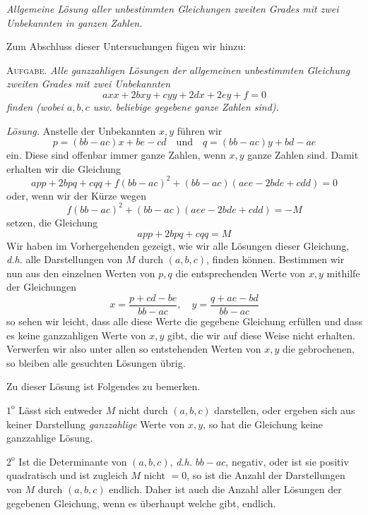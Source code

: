 \begin{center}
\textit{Allgemeine Lösung aller unbestimmten Gleichungen zweiten Grades mit zwei Unbekannten in ganzen Zahlen.}
\end{center}

Zum Abschluss dieser Untersuchungen fügen wir hinzu:

\textsc{Aufgabe.} \textit{Alle ganzzahligen Lösungen der allgemeinen} \textit{unbestimmten Gleichung zweiten Grades mit zwei Unbekannten}
\[
axx+2bxy+cyy+2dx+2ey+f=0
\]
\textit{finden (wobei $a,b,c$ usw. beliebige gegebene ganze Zahlen sind).}

\textit{Lösung.} Anstelle der Unbekannten $x,y$ führen wir
\[
p=(bb-ac)x+be-cd\quad\text{und}\quad q=(bb-ac)y+bd-ae
\]
ein. Diese sind offenbar immer ganze Zahlen, wenn $x,y$ ganze Zahlen sind. Damit erhalten wir die Gleichung
\[
app+2bpq+cqq+f(bb-ac)^2+(bb-ac)(aee-2bde+cdd)=0
\]
oder, wenn wir der Kürze wegen
\[
f(bb-ac)^2+(bb-ac)(aee-2bde+cdd)=-M
\]
setzen, die Gleichung
\[
app+2bpq+cqq=M
\]
Wir haben im Vorhergehenden gezeigt, wie wir alle Lösungen dieser Gleichung, \textit{d.h.} alle Darstellungen von $M$ durch $(a,b,c)$, finden können. Bestimmen wir nun aus den einzelnen Werten von $p,q$ die entsprechenden Werte von $x,y$ mithilfe der Gleichungen
\[
x=\frac{p+cd-be}{bb-ac},\quad y=\frac{q+ae-bd}{bb-ac}
\]
so sehen wir leicht, dass alle diese Werte die gegebene Gleichung erfüllen und dass es keine ganzzahligen Werte von $x,y$ gibt, die wir auf diese Weise nicht erhalten. Verwerfen wir also unter allen so entstehenden Werten von $x,y$ die gebrochenen, so bleiben alle gesuchten Lösungen übrig.

Zu dieser Lösung ist Folgendes zu bemerken.

$1^{\mathrm{o}}$ Lässt sich entweder $M$ nicht durch $(a,b,c)$ darstellen, oder ergeben sich aus keiner Darstellung \textit{ganzzahlige} Werte von $x,y$, so hat die Gleichung keine ganzzahlige Lösung.

$2^{\mathrm{o}}$ Ist die Determinante von $(a,b,c)$, \textit{d.h.} $bb-ac$, negativ, oder ist sie positiv quadratisch und ist zugleich $M$ nicht $=0$, so ist die Anzahl der Darstellungen von $M$ durch $(a,b,c)$ endlich. Daher ist auch die Anzahl aller Lösungen der gegebenen Gleichung, wenn es überhaupt welche gibt, endlich.

